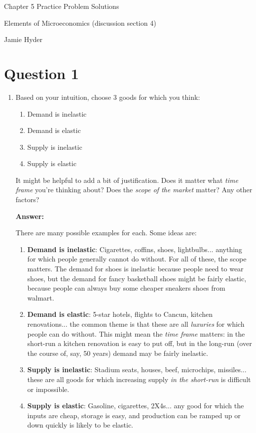 \documentclass[12pt]{article}
\begin{document}
\begin{center}
\Large Chapter 5 Practice Problem Solutions

\medskip

\normalsize Elements of Microeconomics (discussion section 4)

\medskip

\small Jamie Hyder
\end{center}

\medskip
\section*{Question 1}
\begin{enumerate}
\item Based on your intuition, choose 3 goods for which you think:
\begin{enumerate}
    \item Demand is inelastic
    \item Demand is elastic
    \item Supply is inelastic
    \item Supply is elastic
\end{enumerate}
It might be helpful to add a bit of justification. Does it matter what \textit{time frame} you're thinking about? Does the \textit{scope of the market} matter? Any other factors?

\vspace{5mm}

\textbf{Answer:}

\vspace{2mm}

There are many possible examples for each. Some ideas are:
\begin{enumerate}
    \item \textbf{Demand is inelastic}: Cigarettes, coffins, shoes, lightbulbs... anything for which people generally cannot do without. For all of these, the scope matters. The demand for shoes is inelastic because people need to wear shoes, but the demand for fancy basketball shoes might be fairly elastic, because people can always buy some cheaper sneakers shoes from walmart.
    \item \textbf{Demand is elastic}: 5-star hotels, flights to Cancun, kitchen renovations... the common theme is that these are all \textit{luxuries} for which people can do without. This might mean the \textit{time frame} matters: in the short-run a kitchen renovation is easy to put off, but in the long-run (over the course of, say, 50 years) demand may be fairly inelastic.
    \item \textbf{Supply is inelastic}: Stadium seats, houses, beef, microchips, missiles... these are all goods for which increasing supply \textit{in the short-run} is difficult or impossible.
    \item \textbf{Supply is elastic}: Gasoline, cigarettes, 2X4s... any good for which the inputs are cheap, storage is easy, and production can be ramped up or down quickly is likely to be elastic.
\end{enumerate}



\end{enumerate}
\end{document}
